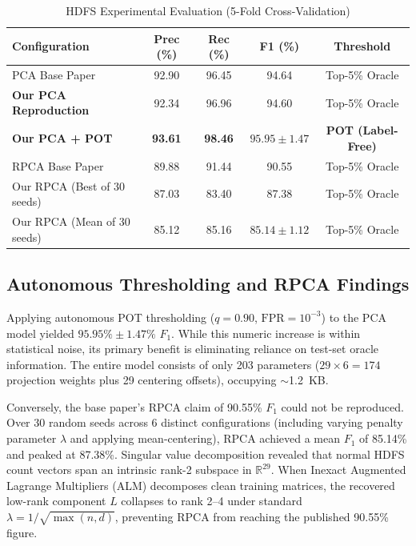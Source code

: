 \documentclass[conference]{IEEEtran}
\begin{document}
\begin{table}[htbp]
\centering
\caption{HDFS Experimental Evaluation (5-Fold Cross-Validation)}
\label{tab:hdfs_results}
\begin{tabular}{lcccc}
\toprule
\textbf{Configuration} & \textbf{Prec (\%)} & \textbf{Rec (\%)} & \textbf{F1 (\%)} & \textbf{Threshold} \\
\midrule
PCA Base Paper~\cite{falt2025lightweight} & 92.90 & 96.45 & 94.64 & Top-5\% Oracle \\
\textbf{Our PCA Reproduction} & 92.34 & 96.96 & 94.60 & Top-5\% Oracle \\
\textbf{Our PCA + POT} & \textbf{93.61} & \textbf{98.46} & $\mathbf{95.95 \pm 1.47}$ & \textbf{POT (Label-Free)} \\
\midrule
RPCA Base Paper~\cite{falt2025lightweight} & 89.88 & 91.44 & 90.55 & Top-5\% Oracle \\
Our RPCA (Best of 30 seeds) & 87.03 & 83.40 & 87.38 & Top-5\% Oracle \\
Our RPCA (Mean of 30 seeds) & 85.12 & 85.16 & $85.14 \pm 1.12$ & Top-5\% Oracle \\
\bottomrule
\end{tabular}
\end{table}

\subsection{Autonomous Thresholding and RPCA Findings}
Applying autonomous POT thresholding ($q=0.90$, $\text{FPR}=10^{-3}$) to the PCA model yielded $95.95\% \pm 1.47\%$ $F_1$. While this numeric increase is within statistical noise, its primary benefit is eliminating reliance on test-set oracle information. The entire model consists of only 203 parameters ($29 \times 6 = 174$ projection weights plus 29 centering offsets), occupying $\sim$1.2~KB.

Conversely, the base paper's RPCA claim of 90.55\% $F_1$ could not be reproduced. Over 30 random seeds across 6 distinct configurations (including varying penalty parameter $\lambda$ and applying mean-centering), RPCA achieved a mean $F_1$ of 85.14\% and peaked at 87.38\%. Singular value decomposition revealed that normal HDFS count vectors span an intrinsic rank-2 subspace in $\mathbb{R}^{29}$. When Inexact Augmented Lagrange Multipliers (ALM) decomposes clean training matrices, the recovered low-rank component $L$ collapses to rank 2--4 under standard $\lambda = 1/\sqrt{\max(n,d)}$, preventing RPCA from reaching the published 90.55\% figure.
\end{document}
